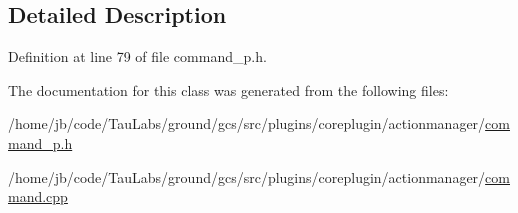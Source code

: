 \subsection{\-Detailed \-Description}


\-Definition at line 79 of file command\-\_\-p.\-h.



\-The documentation for this class was generated from the following files\-:\begin{DoxyCompactItemize}
\item 
/home/jb/code/\-Tau\-Labs/ground/gcs/src/plugins/coreplugin/actionmanager/\hyperlink{command__p_8h}{command\-\_\-p.\-h}\item 
/home/jb/code/\-Tau\-Labs/ground/gcs/src/plugins/coreplugin/actionmanager/\hyperlink{command_8cpp}{command.\-cpp}\end{DoxyCompactItemize}
